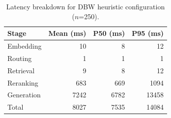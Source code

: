 \begin{table}[t]
\caption{Latency breakdown for DBW heuristic configuration ($n$=250).}
\label{tab:latency}
\centering
\small
\begin{tabular}{lrrr}
\toprule
Stage & Mean (ms) & P50 (ms) & P95 (ms) \\
\midrule
Embedding & 10 & 8 & 12 \\
Routing & 1 & 1 & 1 \\
Retrieval & 9 & 8 & 12 \\
Reranking & 683 & 669 & 1094 \\
Generation & 7242 & 6782 & 13458 \\
\midrule
Total & 8027 & 7535 & 14084 \\
\bottomrule
\end{tabular}
\end{table}